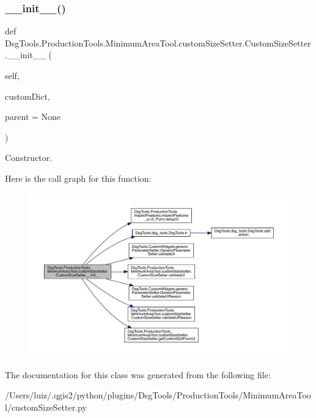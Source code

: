 \subsubsection{\texorpdfstring{\+\_\+\+\_\+init\+\_\+\+\_\+()}{\_\_init\_\_()}}
{\footnotesize\ttfamily def Dsg\+Tools.\+Production\+Tools.\+Minimum\+Area\+Tool.\+custom\+Size\+Setter.\+Custom\+Size\+Setter.\+\_\+\+\_\+init\+\_\+\+\_\+ (\begin{DoxyParamCaption}\item[{}]{self,  }\item[{}]{custom\+Dict,  }\item[{}]{parent = {\ttfamily None} }\end{DoxyParamCaption})}

\begin{DoxyVerb}Constructor.\end{DoxyVerb}
 Here is the call graph for this function\+:
\nopagebreak
\begin{figure}[H]
\begin{center}
\leavevmode
\includegraphics[width=350pt]{class_dsg_tools_1_1_production_tools_1_1_minimum_area_tool_1_1custom_size_setter_1_1_custom_size_setter_aaf58e82318cf23f06fdce625af96318a_cgraph}
\end{center}
\end{figure}


The documentation for this class was generated from the following file\+:\begin{DoxyCompactItemize}
\item 
/\+Users/luiz/.\+qgis2/python/plugins/\+Dsg\+Tools/\+Production\+Tools/\+Minimum\+Area\+Tool/custom\+Size\+Setter.\+py\end{DoxyCompactItemize}
